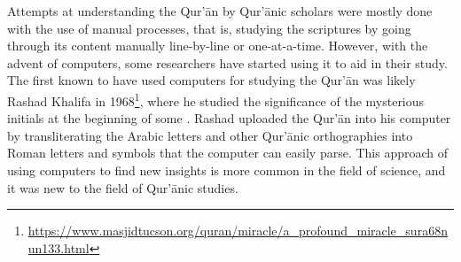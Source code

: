 Attempts at understanding the Qur'\=an by Qur'\=anic scholars were mostly done with the use of manual processes, that is, studying the scriptures by going through its content manually line-by-line or one-at-a-time. However, with the advent of computers, some researchers have started using it to aid in their study. The first known to have used computers for studying the Qur'\=an was likely Rashad Khalifa in 1968\footnote{\url{https://www.masjidtucson.org/quran/miracle/a_profound_miracle_sura68nun133.html}}, where he studied the significance of the mysterious initials at the beginning of some  . Rashad uploaded the Qur'\=an into his computer by transliterating the Arabic letters and other Qur'\=anic orthographies into Roman letters and symbols that the computer can easily parse. This approach of using computers to find new insights is more common in the field of science, and it was new to the field of Qur'\=anic studies.

